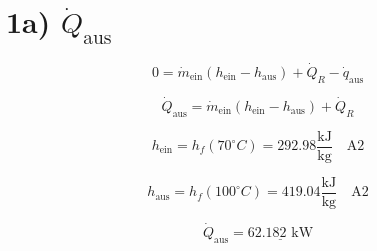 \section*{1a) $\dot{Q}_{\text{aus}}$}

\[
0 = \dot{m}_{\text{ein}} \left( h_{\text{ein}} - h_{\text{aus}} \right) + \dot{Q}_R - \dot{q}_{\text{aus}}
\]

\[
\dot{Q}_{\text{aus}} = \dot{m}_{\text{ein}} \left( h_{\text{ein}} - h_{\text{aus}} \right) + \dot{Q}_R
\]

\[
h_{\text{ein}} = h_f(70^\circ C) = 292.98 \frac{\text{kJ}}{\text{kg}} \quad \text{A2}
\]

\[
h_{\text{aus}} = h_f(100^\circ C) = 419.04 \frac{\text{kJ}}{\text{kg}} \quad \text{A2}
\]

\[
\dot{Q}_{\text{aus}} = \underline{62.182 \text{ kW}}
\]